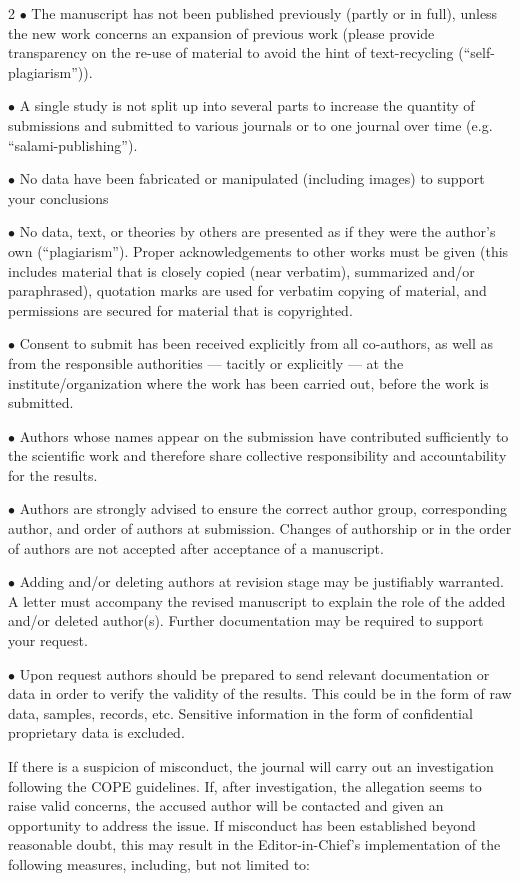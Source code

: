 \documentclass[twoside]{article}
\begin{document}
\begin{multicols}{2}
$\bullet$ The manuscript has not been published previously (partly or in full), unless the new work concerns an expansion of previous work (please provide transparency on the re-use of material to avoid the hint of text-recycling (``self-plagiarism'')).

$\bullet$ A single study is not split up into several parts to increase the quantity of submissions and submitted to various journals or to one journal over time (e.g. ``salami-publishing'').

$\bullet$ No data have been fabricated or manipulated (including images) to support your conclusions

$\bullet$ No data, text, or theories by others are presented as if they were the author's own (``plagiarism''). Proper acknowledgements to other works must be given (this includes material that is closely copied (near verbatim), summarized and/or paraphrased), quotation marks are used for verbatim copying of material, and permissions are secured for material that is copyrighted.

$\bullet$ Consent to submit has been received explicitly from all co-authors, as well as from the responsible authorities --- tacitly or explicitly --- at the institute/organization where the work has been carried out, before the work is submitted.

$\bullet$ Authors whose names appear on the submission have contributed sufficiently to the scientific work and therefore share collective responsibility and accountability for the results.

$\bullet$ Authors are strongly advised to ensure the correct author group, corresponding author, and order of authors at submission. Changes of authorship or in the order of authors are not accepted after acceptance of a manuscript.

$\bullet$ Adding and/or deleting authors at revision stage may be justifiably warranted. A letter must accompany the revised manuscript to explain the role of the added and/or deleted author(s). Further documentation may be required to support your request.

$\bullet$ Upon request authors should be prepared to send relevant documentation or data in order to verify the validity of the results. This could be in the form of raw data, samples, records, etc. Sensitive information in the form of confidential proprietary data is excluded.

If there is a suspicion of misconduct, the journal will carry out an investigation following the COPE guidelines. If, after investigation, the allegation seems to raise valid concerns, the accused author will be contacted and given an opportunity to address the issue. If misconduct has been established beyond reasonable doubt, this may result in the Editor-in-Chief's implementation of the following measures, including, but not limited to:


\end{multicols}
\end{document}
